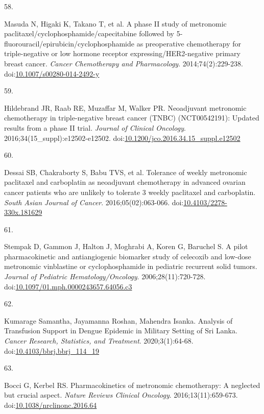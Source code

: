 \documentclass[11pt]{umnthesis}
\newlength{\csllabelwidth}
\newlength{\cslhangindent}
\newenvironment{CSLReferences}[2] %
 {%
  \setlength{\parindent}{0pt}
  \ifodd #1 \everypar{\setlength{\hangindent}{\cslhangindent}}\ignorespaces\fi
  \ifnum #2 > 0
  \setlength{\parskip}{#2\baselineskip}
  \fi
 }%
 {}
\newcommand{\CSLLeftMargin}[1]{\parbox[t]{\csllabelwidth}{#1}}
\newcommand{\CSLRightInline}[1]{\parbox[t]{\linewidth - \csllabelwidth}{#1}}
\begin{document}
\begin{CSLReferences}{0}{0}
\leavevmode{}%
\CSLLeftMargin{58. }
\CSLRightInline{Masuda N, Higaki K, Takano T, et al. A phase {II} study of metronomic paclitaxel/cyclophosphamide/capecitabine followed by 5-fluorouracil/epirubicin/cyclophosphamide as preoperative chemotherapy for triple-negative or low hormone receptor expressing/{HER}2-negative primary breast cancer. \emph{Cancer Chemotherapy and Pharmacology}. 2014;74(2):229-238. doi:\href{https://doi.org/10.1007/s00280-014-2492-y}{10.1007/s00280-014-2492-y}}

\leavevmode{}%
\CSLLeftMargin{59. }
\CSLRightInline{Hildebrand JR, Raab RE, Muzaffar M, Walker PR. Neoadjuvant metronomic chemotherapy in triple-negative breast cancer ({TNBC}) ({NCT}00542191): Updated results from a phase {II} trial. \emph{Journal of Clinical Oncology}. 2016;34(15{\_}suppl):e12502-e12502. doi:\href{https://doi.org/10.1200/jco.2016.34.15_suppl.e12502}{10.1200/jco.2016.34.15\_suppl.e12502}}

\leavevmode{}%
\CSLLeftMargin{60. }
\CSLRightInline{Dessai SB, Chakraborty S, Babu TVS, et al. Tolerance of weekly metronomic paclitaxel and carboplatin as neoadjuvant chemotherapy in advanced ovarian cancer patients who are unlikely to tolerate 3 weekly paclitaxel and carboplatin. \emph{South Asian Journal of Cancer}. 2016;05(02):063-066. doi:\href{https://doi.org/10.4103/2278-330x.181629}{10.4103/2278-330x.181629}}

\leavevmode{}%
\CSLLeftMargin{61. }
\CSLRightInline{Stempak D, Gammon J, Halton J, Moghrabi A, Koren G, Baruchel S. A pilot pharmacokinetic and antiangiogenic biomarker study of celecoxib and low-dose metronomic vinblastine or cyclophosphamide in pediatric recurrent solid tumors. \emph{Journal of Pediatric Hematology/Oncology}. 2006;28(11):720-728. doi:\href{https://doi.org/10.1097/01.mph.0000243657.64056.c3}{10.1097/01.mph.0000243657.64056.c3}}

\leavevmode{}%
\CSLLeftMargin{62. }
\CSLRightInline{Kumarage Samantha, Jayamanna Roshan, Mahendra Isanka. {Analysis of Transfusion Support in Dengue Epidemic in Military Setting of Sri Lanka}. \emph{Cancer Research, Statistics, and Treatment}. 2020;3(1):64-68. doi:\href{https://doi.org/10.4103/bbrj.bbrj_114_19}{10.4103/bbrj.bbrj\_114\_19}}

\leavevmode{}%
\CSLLeftMargin{63. }
\CSLRightInline{Bocci G, Kerbel RS. Pharmacokinetics of metronomic chemotherapy: A neglected but crucial aspect. \emph{Nature Reviews Clinical Oncology}. 2016;13(11):659-673. doi:\href{https://doi.org/10.1038/nrclinonc.2016.64}{10.1038/nrclinonc.2016.64}}


\end{CSLReferences}
\end{document}
